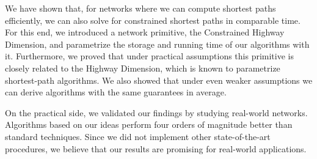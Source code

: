We have shown that, for networks where we can compute shortest paths efficiently, we can also solve for constrained shortest paths in comparable time.
For this end, we introduced a network primitive, the Constrained Highway Dimension, and parametrize the storage and running time of our algorithms with it.
Furthermore, we proved that under practical assumptions this primitive is closely related to the Highway Dimension, which is known to parametrize shortest-path algorithms.
We also showed that under even weaker assumptions we can derive algorithms with the same guarantees in average.

On the practical side, we validated our findings by studying real-world networks.
Algorithms based on our ideas perform four orders of magnitude better than standard techniques.
Since we did not implement other state-of-the-art procedures, we believe that our results are promising for real-world applications.
